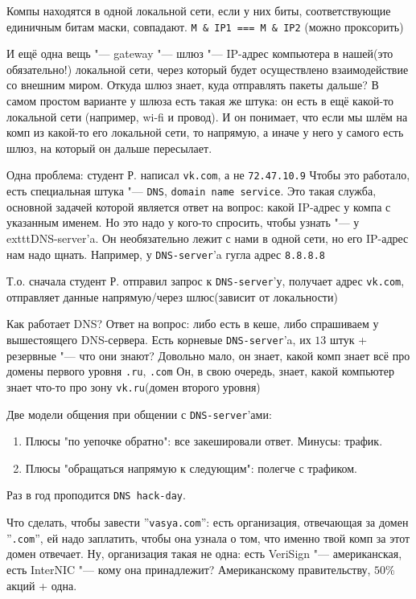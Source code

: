 Компы находятся в одной локальной сети, если у них биты, соответствующие единичным битам маски, совпадают.
\texttt{M \& IP1 === M \& IP2} (можно проксорить)

И ещё одна вещь "--- gateway "--- шлюз "--- IP-адрес компьютера в нашей(это обязательно!) локальной сети, 
через который будет осуществлено взаимодействие со внешним миром.
Откуда шлюз знает, куда отправлять пакеты дальше?
В самом простом варианте у шлюза есть такая же штука: 
он есть в ещё какой-то локальной сети (например, wi-fi и провод).
И он понимает, что если мы шлём на комп из какой-то его локальной сети, то напрямую, 
а иначе у него у самого есть шлюз, на который он дальше пересылает.

Одна проблема: студент Р. написал \texttt{vk.com}, а не \texttt{72.47.10.9}
Чтобы это работало, есть специальная штука "--- \texttt{DNS}, \texttt{domain name service}.
Это такая служба, основной задачей которой является ответ на вопрос: какой IP-адрес у компа с указанным именем.
Но это надо у кого-то спросить, чтобы узнать "--- у     exttt{DNS-server}'a. Он необязательно лежит с нами в одной сети, но его IP-адрес нам надо щнать.
Например, у \texttt{DNS-server}'a гугла адрес \texttt{8.8.8.8}

Т.о. сначала студент Р. отправил запрос к \texttt{DNS-server}'у, получает адрес \texttt{vk.com}, отправляет данные напрямую/через шлюс(зависит от локальности)

Как работает DNS?
Ответ на вопрос: либо есть в кеше, либо спрашиваем у вышестоящего DNS-сервера.
Есть корневые \texttt{DNS-server}'a, их $13$ штук + резервные "--- что они знают? Довольно мало, он знает, какой комп знает всё про домены первого уровня
\texttt{.ru}, \texttt{.com}
Он, в свою очередь, знает, какой компьютер знает что-то про зону \texttt{vk.ru}(домен второго уровня)

Две модели общения при общении с \texttt{DNS-server}'ами:
\begin{enumerate}
\item
Плюсы "по уепочке обратно": 
все закешировали ответ.
Минусы: трафик.
\item
Плюсы "обращаться напрямую к следующим":
полегче с трафиком.
\end{enumerate}

Раз в год проподится \texttt{DNS hack-day}.


Что сделать, чтобы завести ''\texttt{vasya.com}'':
есть организация, отвечающая за домен ''\texttt{.com}'', 
ей надо заплатить, чтобы она узнала о том, что именно твой комп за этот домен отвечает. 
Ну, организация такая не одна: есть
VeriSign "--- американская, есть
InterNIC "--- кому она принадлежит? Американскому правительству, $50$\% акций + одна.


